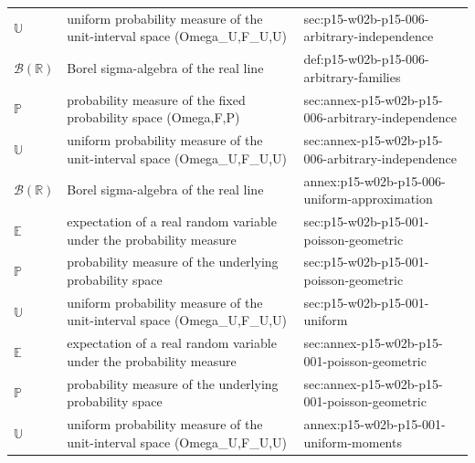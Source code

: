\begin{longtable}{@{}p{}p{}p{}@{}}
\(\mathbb U\) & uniform probability measure of the unit-interval space (Omega\_U,F\_U,U) & sec:\allowbreak{}p15-\allowbreak{}w02b-\allowbreak{}p15-\allowbreak{}006-\allowbreak{}arbitrary-\allowbreak{}independence \\
\(\mathcal B(\mathbb R)\) & Borel sigma-algebra of the real line & def:\allowbreak{}p15-\allowbreak{}w02b-\allowbreak{}p15-\allowbreak{}006-\allowbreak{}arbitrary-\allowbreak{}families \\
\(\mathbb P\) & probability measure of the fixed probability space (Omega,F,P) & sec:\allowbreak{}annex-\allowbreak{}p15-\allowbreak{}w02b-\allowbreak{}p15-\allowbreak{}006-\allowbreak{}arbitrary-\allowbreak{}independence \\
\(\mathbb U\) & uniform probability measure of the unit-interval space (Omega\_U,F\_U,U) & sec:\allowbreak{}annex-\allowbreak{}p15-\allowbreak{}w02b-\allowbreak{}p15-\allowbreak{}006-\allowbreak{}arbitrary-\allowbreak{}independence \\
\(\mathcal B(\mathbb R)\) & Borel sigma-algebra of the real line & annex:\allowbreak{}p15-\allowbreak{}w02b-\allowbreak{}p15-\allowbreak{}006-\allowbreak{}uniform-\allowbreak{}approximation \\
\(\mathbb E\) & expectation of a real random variable under the probability measure & sec:\allowbreak{}p15-\allowbreak{}w02b-\allowbreak{}p15-\allowbreak{}001-\allowbreak{}poisson-\allowbreak{}geometric \\
\(\mathbb P\) & probability measure of the underlying probability space & sec:\allowbreak{}p15-\allowbreak{}w02b-\allowbreak{}p15-\allowbreak{}001-\allowbreak{}poisson-\allowbreak{}geometric \\
\(\mathbb U\) & uniform probability measure of the unit-interval space (Omega\_U,F\_U,U) & sec:\allowbreak{}p15-\allowbreak{}w02b-\allowbreak{}p15-\allowbreak{}001-\allowbreak{}uniform \\
\(\mathbb E\) & expectation of a real random variable under the probability measure & sec:\allowbreak{}annex-\allowbreak{}p15-\allowbreak{}w02b-\allowbreak{}p15-\allowbreak{}001-\allowbreak{}poisson-\allowbreak{}geometric \\
\(\mathbb P\) & probability measure of the underlying probability space & sec:\allowbreak{}annex-\allowbreak{}p15-\allowbreak{}w02b-\allowbreak{}p15-\allowbreak{}001-\allowbreak{}poisson-\allowbreak{}geometric \\
\(\mathbb U\) & uniform probability measure of the unit-interval space (Omega\_U,F\_U,U) & annex:\allowbreak{}p15-\allowbreak{}w02b-\allowbreak{}p15-\allowbreak{}001-\allowbreak{}uniform-\allowbreak{}moments \\

\end{longtable}
